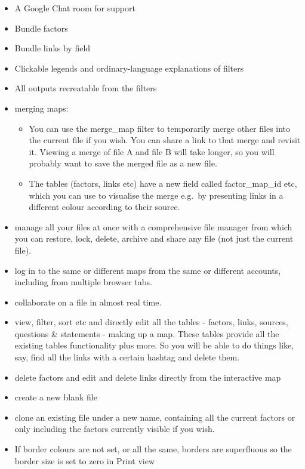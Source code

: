 \documentclass[
]{book}
\providecommand{\tightlist}{%
  \setlength{\itemsep}{0pt}\setlength{\parskip}{0pt}}
\begin{document}
\begin{itemize}
\item
  A Google Chat room for support
\item
  Bundle factors
\item
  Bundle links by field
\item
  Clickable legends and ordinary-language explanations of filters
\item
  All outputs recreatable from the filters
\item
  merging maps:

  \begin{itemize}
  \tightlist
  \item
    You can use the merge\_map filter to temporarily merge other files into the current file if you wish. You can share a link to that merge and revisit it. Viewing a merge of file A and file B will take longer, so you will probably want to save the merged file as a new file.
  \item
    The tables (factors, links etc) have a new field called factor\_map\_id etc, which you can use to visualise the merge e.g.~by presenting links in a different colour according to their source.
  \end{itemize}
\item
  manage all your files at once with a comprehensive file manager from which you can restore, lock, delete, archive and share any file (not just the current file).
\item
  log in to the same or different maps from the same or different accounts, including from multiple browser tabs.
\item
  collaborate on a file in almost real time.
\item
  view, filter, sort etc and directly edit all the tables - factors, links, sources, questions \& statements - making up a map. These tables provide all the existing tables functionality plus more. So you will be able to do things like, say, find all the links with a certain hashtag and delete them.
\item
  delete factors and edit and delete links directly from the interactive map
\item
  create a new blank file
\item
  clone an existing file under a new name, containing all the current factors or only including the factors currently visible if you wish.
\item
  If border colours are not set, or all the same, borders are superfluous so the border size is set to zero in Print view

\end{itemize}
\end{document}
